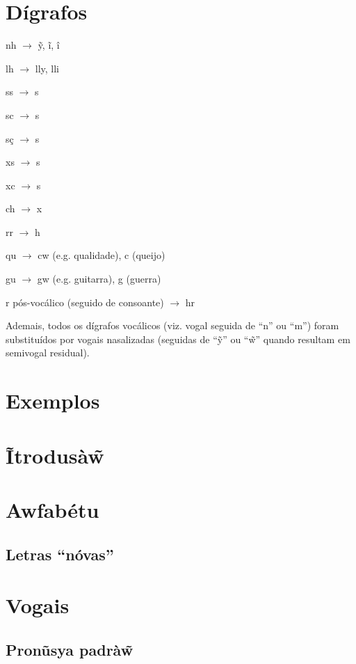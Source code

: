 \documentclass[12pt, a4paper]{article}
\begin{document}
\begin{bilingualpages}
    \section{Dígrafos}
    nh $\rightarrow$ \~y, ĩ, î
    
    lh $\rightarrow$ lly, lli
    
    ss $\rightarrow$ s
    
    sc $\rightarrow$ s
    
    sç $\rightarrow$ s
    
    xs $\rightarrow$ s
    
    xc $\rightarrow$ s
    
    ch $\rightarrow$ x
    
    rr $\rightarrow$ h

    qu $\rightarrow$ cw (e.g. qualidade), c (queijo)
    
    gu $\rightarrow$ gw (e.g. guitarra), g (guerra)

    r pós-vocálico (seguido de consoante) $\rightarrow$ hr

    Ademais, todos os dígrafos vocálicos (viz. vogal seguida de ``n'' ou ``m'') foram substituídos por vogais nasalizadas (seguidas de ``\~y'' ou ``\~w'' quando resultam em semivogal residual).
    
    \section{Exemplos}
    
    \leftpage
    \section{Ĩtrodusà\~{w}}
    
    \newpage
    \section{Awfabétu}
    \BrTableAbc

    \subsection{Letras ``nóvas''}
    
    \section{Vogais}
    \subsection{Pronũsya padrà\~w}

\end{bilingualpages}
\end{document}
